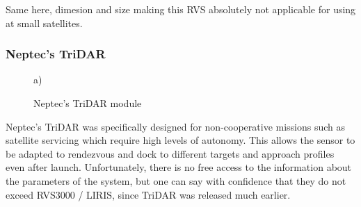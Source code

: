 \begin{figure}[h]
\begin{floatrow}
\end{floatrow}
\end{figure}

Same here, dimesion and size making this RVS absolutely not applicable for using at small satellites.


\subsubsection{Neptec's TriDAR}
\begin{minipage}[h]{0.40\linewidth}
\begin{figure}[H]
 a) \\
\caption{Neptec's TriDAR module}
\label{fig:cubesat}
\end{figure}
\end{minipage}
\hfill
\begin{minipage}[h]{0.48\linewidth}
Neptec’s TriDAR was specifically designed for non-cooperative missions such as satellite servicing which require high levels of autonomy.
This allows the sensor to be adapted to rendezvous and dock to different targets and approach profiles even after launch.
Unfortunately, there is no free access to the information about the parameters of the system, but one can say with confidence that they do not exceed RVS3000 / LIRIS, since TriDAR was released much earlier.
\end{minipage}
\vspace{1cm}
